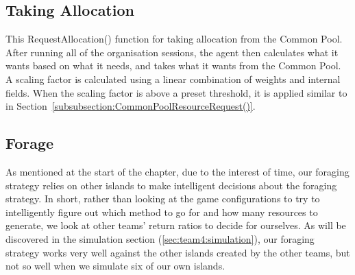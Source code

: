 \subsection{Taking Allocation}
This RequestAllocation() function for taking allocation from the Common Pool. After running all of the organisation sessions, the agent then calculates what it wants based on what it needs, and takes what it wants from the Common Pool. A scaling factor is calculated using a linear combination of weights and internal fields. When the scaling factor is above a preset threshold, it is applied similar to in Section~\ref{subsubsection:CommonPoolResourceRequest()}.  %

\subsection{Forage} \label{sec:team4:forage}
As mentioned at the start of the chapter, due to the interest of time, our foraging strategy relies on other islands to make intelligent decisions about the foraging strategy. In short, rather than looking at the game configurations to try to intelligently figure out which method to go for and how many resources to generate, we look at other teams' return ratios to decide for ourselves. As will be discovered in the simulation section (\ref{sec:team4:simulation}), our foraging strategy works very well against the other islands created by the other teams, but not so well when we simulate six of our own islands.  

